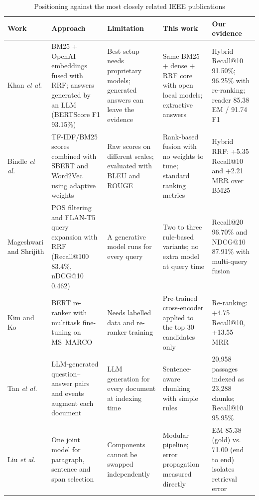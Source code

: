 \documentclass[conference]{IEEEtran}
\begin{document}
\begin{table}[t]
\centering
\caption{Positioning against the most closely related IEEE publications}
\label{tab:position}
\footnotesize
\renewcommand{\arraystretch}{1.15}
\begin{tabular}{@{}p{}p{}p{}p{}p{}@{}}
\toprule
\textbf{Work} & \textbf{Approach} & \textbf{Limitation} & \textbf{This work} & \textbf{Our evidence} \\
\midrule
Khan \emph{et al.} \cite{khan2026} &
BM25 + OpenAI embeddings fused with RRF; answers generated by an LLM (BERTScore F1 93.15\%) &
Best setup needs proprietary models; generated answers can leave the evidence &
Same BM25 + dense + RRF core with open local models; extractive answers &
Hybrid Recall@10 91.50\%; 96.25\% with re-ranking; reader 85.38 EM / 91.74 F1 \\
Bindle \emph{et al.} \cite{bindle2025} &
TF-IDF/BM25 scores combined with SBERT and Word2Vec using adaptive weights &
Raw scores on different scales; evaluated with BLEU and ROUGE &
Rank-based fusion with no weights to tune; standard ranking metrics &
Hybrid RRF: +5.35 Recall@10 and +2.21 MRR over BM25 \\
Mageshwari and Shrijith \cite{mageshwari2026} &
POS filtering and FLAN-T5 query expansion with RRF (Recall@100 83.4\%, nDCG@10 0.462) &
A generative model runs for every query &
Two to three rule-based variants; no extra model at query time &
Recall@20 96.70\% and NDCG@10 87.91\% with multi-query fusion \\
Kim and Ko \cite{kim2022} &
BERT re-ranker with multitask fine-tuning on MS~MARCO &
Needs labelled data and re-ranker training &
Pre-trained cross-encoder applied to the top 30 candidates only &
Re-ranking: +4.75 Recall@10, +13.55 MRR \\
Tan \emph{et al.} \cite{tan2025} &
LLM-generated question--answer pairs and events augment each document &
LLM generation for every document at indexing time &
Sentence-aware chunking with simple rules &
20,958 passages indexed as 23,288 chunks; Recall@10 95.95\% \\
Liu \emph{et al.} \cite{liu2023} &
One joint model for paragraph, sentence and span selection &
Components cannot be swapped independently &
Modular pipeline; error propagation measured directly &
EM 85.38 (gold) vs. 71.00 (end to end) isolates retrieval error \\
\bottomrule
\end{tabular}
\end{table}
\end{document}
